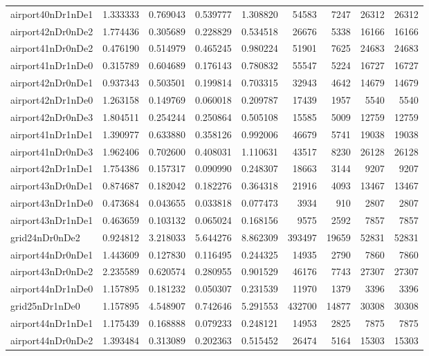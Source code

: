 \begin{longtable}{|l|r|r|r|r|r|r|r|r|}
airport40nDr1nDe1 & 1.333333 & 0.769043 & 0.539777 & 1.308820 & 54583 & 7247 & 26312 & 26312 \\
airport42nDr0nDe2 & 1.774436 & 0.305689 & 0.228829 & 0.534518 & 26676 & 5338 & 16166 & 16166 \\
airport41nDr0nDe2 & 0.476190 & 0.514979 & 0.465245 & 0.980224 & 51901 & 7625 & 24683 & 24683 \\
airport41nDr1nDe0 & 0.315789 & 0.604689 & 0.176143 & 0.780832 & 55547 & 5224 & 16727 & 16727 \\
airport42nDr0nDe1 & 0.937343 & 0.503501 & 0.199814 & 0.703315 & 32943 & 4642 & 14679 & 14679 \\
airport42nDr1nDe0 & 1.263158 & 0.149769 & 0.060018 & 0.209787 & 17439 & 1957 & 5540 & 5540 \\
airport42nDr0nDe3 & 1.804511 & 0.254244 & 0.250864 & 0.505108 & 15585 & 5009 & 12759 & 12759 \\
airport41nDr1nDe1 & 1.390977 & 0.633880 & 0.358126 & 0.992006 & 46679 & 5741 & 19038 & 19038 \\
airport41nDr0nDe3 & 1.962406 & 0.702600 & 0.408031 & 1.110631 & 43517 & 8230 & 26128 & 26128 \\
airport42nDr1nDe1 & 1.754386 & 0.157317 & 0.090990 & 0.248307 & 18663 & 3144 & 9207 & 9207 \\
airport43nDr0nDe1 & 0.874687 & 0.182042 & 0.182276 & 0.364318 & 21916 & 4093 & 13467 & 13467 \\
airport43nDr1nDe0 & 0.473684 & 0.043655 & 0.033818 & 0.077473 & 3934 & 910 & 2807 & 2807 \\
airport43nDr1nDe1 & 0.463659 & 0.103132 & 0.065024 & 0.168156 & 9575 & 2592 & 7857 & 7857 \\
grid24nDr0nDe2 & 0.924812 & 3.218033 & 5.644276 & 8.862309 & 393497 & 19659 & 52831 & 52831 \\
airport44nDr0nDe1 & 1.443609 & 0.127830 & 0.116495 & 0.244325 & 14935 & 2790 & 7860 & 7860 \\
airport43nDr0nDe2 & 2.235589 & 0.620574 & 0.280955 & 0.901529 & 46176 & 7743 & 27307 & 27307 \\
airport44nDr1nDe0 & 1.157895 & 0.181232 & 0.050307 & 0.231539 & 11970 & 1379 & 3396 & 3396 \\
grid25nDr1nDe0 & 1.157895 & 4.548907 & 0.742646 & 5.291553 & 432700 & 14877 & 30308 & 30308 \\
airport44nDr1nDe1 & 1.175439 & 0.168888 & 0.079233 & 0.248121 & 14953 & 2825 & 7875 & 7875 \\
airport44nDr0nDe2 & 1.393484 & 0.313089 & 0.202363 & 0.515452 & 26474 & 5164 & 15303 & 15303 \\

\end{longtable}
